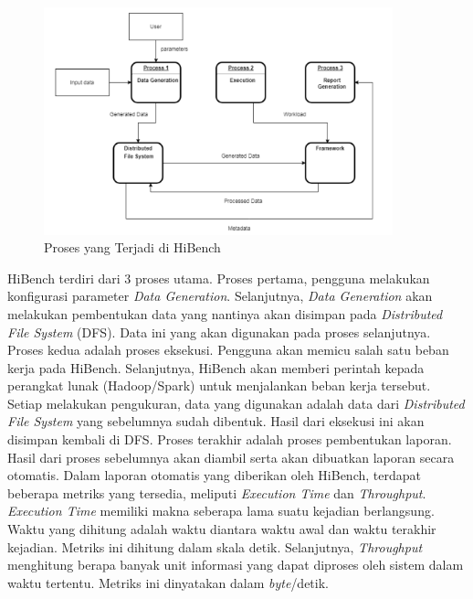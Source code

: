 \begin{figure}[h]
    \centering
    \includegraphics[width=0.9\textwidth]{figures/ch02/hibench-flow}
    \caption{Proses yang Terjadi di HiBench \cite{barosenAnalysisComparisonInterfacing2018}}
    \label{fig:hibench-process-flow}
\end{figure}

HiBench terdiri dari 3 proses utama. Proses pertama, pengguna melakukan konfigurasi parameter \textit{Data Generation}. Selanjutnya, \textit{Data Generation} akan melakukan pembentukan data yang nantinya akan disimpan pada \textit{Distributed File System} (DFS). Data ini yang akan digunakan pada proses selanjutnya. Proses kedua adalah proses eksekusi. Pengguna akan memicu salah satu beban kerja pada HiBench. Selanjutnya, HiBench akan memberi perintah kepada perangkat lunak (Hadoop/Spark) untuk menjalankan beban kerja tersebut. Setiap melakukan pengukuran, data yang digunakan adalah data dari \textit{Distributed File System} yang sebelumnya sudah dibentuk. Hasil dari eksekusi ini akan disimpan kembali di DFS. Proses terakhir adalah proses pembentukan laporan. Hasil dari proses sebelumnya akan diambil serta akan dibuatkan laporan secara otomatis.
Dalam laporan otomatis yang diberikan oleh HiBench, terdapat beberapa metriks yang tersedia, meliputi \textit{Execution Time} dan \textit{Throughput}. \textit{Execution Time} memiliki makna seberapa lama suatu kejadian berlangsung. Waktu yang dihitung adalah waktu diantara waktu awal dan waktu terakhir kejadian. Metriks ini dihitung dalam skala detik. Selanjutnya, \textit{Throughput} menghitung berapa banyak unit informasi yang dapat diproses oleh sistem dalam waktu tertentu. Metriks ini dinyatakan dalam \textit{byte}/detik.

